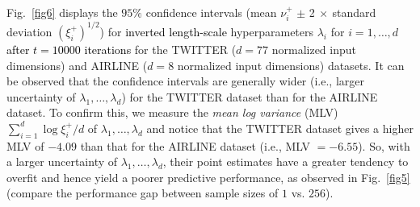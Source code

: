\documentclass[conference]{IEEEtran}
\begin{document}
Fig.~\ref{fig6} displays the $95\%$ confidence intervals (mean $\nu^+_i$ $\pm$ 2$\ \times\ $standard deviation $(\xi^+_i)^{1/2}$) for \textcolor{black}{inverted length-scale} hyperparameters $\lambda_i$ for $i=1,\ldots,d$ \textcolor{black}{after $t=10000$ iterations} for the TWITTER ($d=77$ normalized input dimensions) and AIRLINE ($d=8$ normalized input dimensions) datasets. It can be observed that the confidence intervals  are generally wider (i.e., larger uncertainty of $\lambda_1,\ldots,\lambda_d$) for the TWITTER dataset than for the AIRLINE dataset. To confirm this, we measure the \emph{mean log variance} (MLV) $\sum^d_{i=1}\log\xi^+_i/d$ of $\lambda_1,\ldots,\lambda_d$ and notice that the TWITTER dataset gives a higher MLV of $-4.09$ than that for the AIRLINE dataset (i.e., MLV $= -6.55$).
So, with a larger uncertainty of $\lambda_1,\ldots,\lambda_d$, their point estimates have a greater tendency to overfit and hence yield a poorer predictive performance, as observed in Fig.~\ref{fig5} (compare the performance gap between sample sizes of $1$ vs. $256$).
%
%
\end{document}
